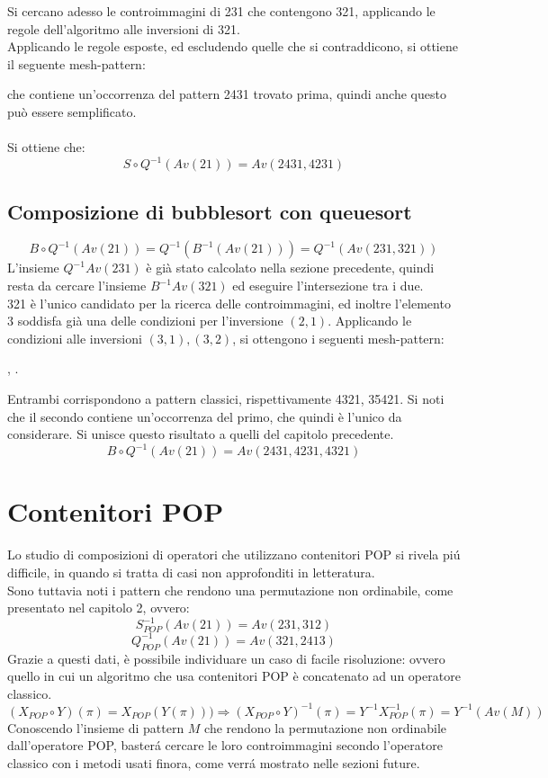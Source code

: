 Si cercano adesso le controimmagini di 231 che contengono 321, applicando le regole dell'algoritmo alle inversioni di 321.\\
Applicando le regole esposte, ed escludendo quelle che si contraddicono, si ottiene il seguente mesh-pattern: 
\begin{center}
\end{center}
che contiene un'occorrenza del pattern 2431 trovato prima, quindi anche questo pu\`o essere semplificato.\\\\
Si ottiene che:$$S\circ Q^{-1}(Av(21)) = Av(2431, 4231)$$
\subsection{Composizione di {bubblesort} con {queuesort}}
$$B\circ Q^{-1}(Av(21)) = Q^{-1}(B^{-1}(Av(21))) = Q^{-1}(Av(231,321))$$
L'insieme $Q^{-1}Av(231)$ \`e gi\`a stato calcolato nella sezione precedente, quindi resta da cercare l'insieme $B^{-1}Av(321)$ ed eseguire l'intersezione tra i due.\\321 \`e l'unico candidato per la ricerca delle controimmagini, ed inoltre l'elemento 3 soddisfa gi\`a una delle condizioni per l'inversione $(2,1)$. Applicando le condizioni alle inversioni $(3,1),(3,2)$, si ottengono i seguenti mesh-pattern:
\begin{center}
,
.
\end{center}  
Entrambi corrispondono a pattern classici, rispettivamente 4321, 35421. Si noti che il secondo contiene un'occorrenza del primo, che quindi \`e l'unico da considerare. Si unisce questo risultato a quelli del capitolo precedente.
$$B\circ Q^{-1}(Av(21)) = Av(2431, 4231, 4321)$$ 
\section{Contenitori POP}
Lo studio di composizioni di operatori che utilizzano contenitori POP si rivela pi\'u difficile, in quando si tratta di casi non approfonditi in letteratura.\\
Sono tuttavia noti i pattern che rendono una permutazione non ordinabile, come presentato nel capitolo 2, ovvero:
$$S_{POP}^{-1}(Av(21)) = Av(231,312)$$$$Q_{POP}^{-1}(Av(21))=Av(321,2413)$$
Grazie a questi dati, \`e possibile individuare un caso di facile risoluzione: ovvero quello in cui un algoritmo che usa contenitori POP \`e concatenato ad un operatore classico.
$$(X_{POP}\circ{Y})(\pi)= X_{POP}(Y(\pi)))\Rightarrow(X_{POP}\circ{Y})^{-1}(\pi) = Y^{-1}X_{POP}^{-1}(\pi)=Y^{-1}(Av(M))$$
Conoscendo l'insieme di pattern $M$ che rendono la permutazione non ordinabile dall'operatore POP, baster\'a cercare le loro controimmagini secondo l'operatore classico con i metodi usati finora, come verr\'a mostrato nelle sezioni future.
